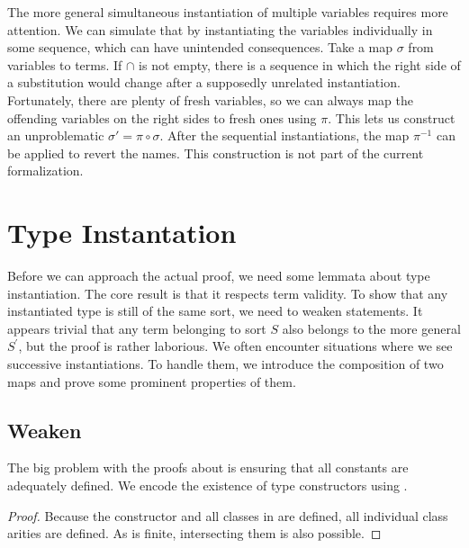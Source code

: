The more general simultaneous instantiation of multiple variables requires more attention.
We can simulate that by instantiating the variables individually in some sequence, which can have unintended consequences.
Take a map \(\sigma\) from variables to terms.
If  \(\cap\)  is not empty, there is a sequence in which the right side of a substitution would change after a supposedly unrelated instantiation.
Fortunately, there are plenty of fresh variables, so we can always map the offending variables on the right sides to fresh ones using \(\pi\).
This lets us construct an unproblematic \(\sigma' = \pi \circ \sigma\).
After the sequential instantiations, the map \(\pi^{-1}\) can be applied to revert the names.
This construction is not part of the current formalization.

\section{Type Instantation}

Before we can approach the actual proof, we need some lemmata about type instantiation.
The core result is that it respects term validity.
To show that any instantiated type is still of the same sort, we need to weaken  statements.
It appears trivial that any term belonging to sort \(S\) also belongs to the more general \(S^\prime\), but the proof is rather laborious.
We often encounter situations where we see successive instantiations.
To handle them, we introduce the composition of two maps and prove some prominent properties of them.

\subsection{Weaken }

The big problem with the proofs about  is ensuring that all constants are adequately defined.
We encode the existence of type constructors using .

\begin{lemma}
\end{lemma}
\begin{proof}
    Because the constructor and all classes in  are defined, all individual class arities are defined.
    As  is finite, intersecting them is also possible.
\end{proof}

